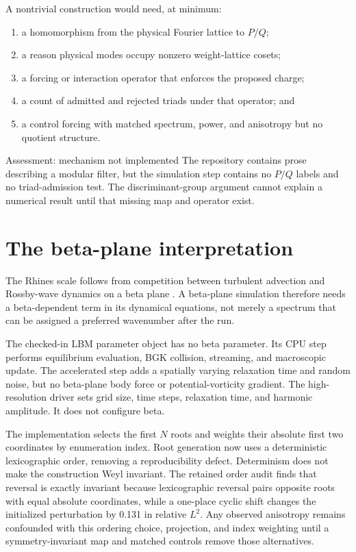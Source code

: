 A nontrivial construction would need, at minimum:

\begin{enumerate}
  \item a homomorphism from the physical Fourier lattice to $P/Q$;
  \item a reason physical modes occupy nonzero weight-lattice cosets;
  \item a forcing or interaction operator that enforces the proposed charge;
  \item a count of admitted and rejected triads under that operator; and
  \item a control forcing with matched spectrum, power, and anisotropy but no
    quotient structure.
\end{enumerate}

\begin{evidence}{Assessment: mechanism not implemented}
The repository contains prose describing a modular filter, but the simulation
step contains no $P/Q$ labels and no triad-admission test. The discriminant-group
argument cannot explain a numerical result until that missing map and operator
exist.
\end{evidence}

\section{The beta-plane interpretation}

The Rhines scale follows from competition between turbulent advection and
Rossby-wave dynamics on a beta plane \citep{rhines1975waves,vallis1993generation}.
A beta-plane simulation therefore needs a beta-dependent term in its dynamical
equations, not merely a spectrum that can be assigned a preferred wavenumber
after the run.

The checked-in LBM parameter object has no beta parameter. Its CPU step performs
equilibrium evaluation, BGK collision, streaming, and macroscopic update. The
accelerated step adds a spatially varying relaxation time and random noise, but
no beta-plane body force or potential-vorticity gradient. The high-resolution
driver sets grid size, time steps, relaxation time, and harmonic amplitude.
It does not configure beta.

The implementation selects the first $N$ roots and weights their absolute first
two coordinates by enumeration index. Root generation now uses a deterministic
lexicographic order, removing a reproducibility defect. Determinism does not
make the construction Weyl invariant. The retained order audit finds that
reversal is exactly invariant because lexicographic reversal pairs opposite
roots with equal absolute coordinates, while a one-place cyclic shift changes
the initialized perturbation by 0.131 in relative $L^2$. Any observed
anisotropy remains confounded with this ordering choice, projection, and index
weighting until a symmetry-invariant map and matched controls remove those
alternatives.

